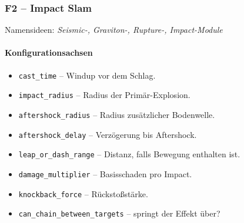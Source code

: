 \subsubsection{F2 – Impact Slam}
Namensideen: \emph{Seismic-, Graviton-, Rupture-, Impact-Module}

\paragraph{Konfigurationsachsen}{}

\begin{itemize}
	\item \texttt{cast\_time} – Windup vor dem Schlag.
	\item \texttt{impact\_radius} – Radius der Primär-Explosion.
	\item \texttt{aftershock\_radius} – Radius zusätzlicher Bodenwelle.
	\item \texttt{aftershock\_delay} – Verzögerung bis Aftershock.
	\item \texttt{leap\_or\_dash\_range} – Distanz, falls Bewegung enthalten ist.
	\item \texttt{damage\_multiplier} – Basisschaden pro Impact.
	\item \texttt{knockback\_force} – Rückstoßstärke.
	\item \texttt{can\_chain\_between\_targets} – springt der Effekt über?
\end{itemize}

